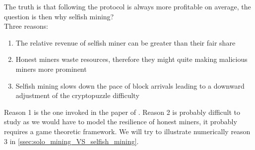 The truth is that following the protocol is always more profitable on average, the question is then why selfish mining?\\

Three reasons:
\begin{enumerate}
  \item The relative revenue of selfish miner can be greater than their fair share
  \item Honest miners waste resources, therefore they might quite making malicious miners more prominent
  \item Selfish mining slows down the pace of block arrivals leading to a downward adjustment of the cryptopuzzle difficulty
\end{enumerate}
Reason 1 is the one invoked in the paper of \citet{Eyal2014}. Reason 2 is probably difficult to study as we would have to model the resilience of honest miners, it probably requires a game theoretic framework. We will try to illustrate numerically reason 3 in \cref{ssec:solo_mining_VS_selfish_mining}.

